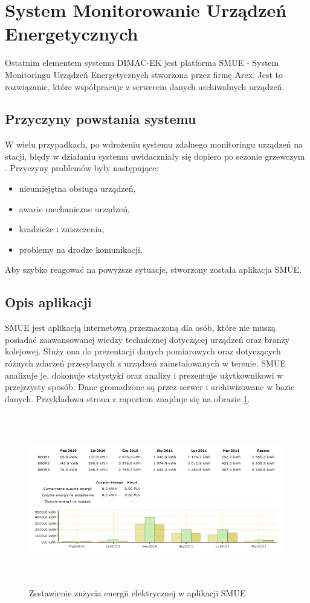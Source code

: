 \section{System Monitorowanie Urządzeń Energetycznych}
Ostatnim elementem systemu DIMAC-EK jest platforma SMUE - System Monitoringu Urządzeń Energetycznych stworzona przez firmę Arex. Jest to rozwiązanie, które współpracuje z serwerem danych archiwalnych urządzeń\cite{dimacek-wytyczne}. 

\subsection{Przyczyny powstania systemu}
W wielu przypadkach, po wdrożeniu systemu zdalnego monitoringu urządzeń na stacji, błędy w działaniu systemu uwidaczniały się dopiero po sezonie grzewczym \cite{dimacek-wytyczne}. Przyczyny problemów były następujące:
\begin{itemize}
\item nieumiejętna obsługa urządzeń,
\item awarie mechaniczne urządzeń,
\item kradzieże i zniszczenia,
\item problemy na drodze komunikacji.
\end{itemize}

Aby szybko reagować na powyższe sytuacje, stworzony została aplikacja SMUE.

\subsection{Opis aplikacji}
SMUE jest aplikacją internetową przeznaczoną dla osób, które nie muszą posiadać zaawansowanej wiedzy technicznej dotyczącej urządzeń oraz branży kolejowej\cite{dimacek-wytyczne}. Służy ona do prezentacji danych pomiarowych oraz dotyczących różnych zdarzeń przesyłanych z urządzeń zainstalowanych w terenie. SMUE analizuje je, dokonuje statystyki oraz analizy i prezentuje użytkownikowi w przejrzysty sposób. Dane gromadzone są  przez serwer i archiwizowane w bazie danych. Przykładowa strona z raportem znajduje się na obrazie \ref{fig:smue}.\\

\begin{figure}[h]
		\centerline{\includegraphics[height=75mm]{./img/smue.png}}
		\caption{Zestawienie zużycia energii elektrycznej w aplikacji SMUE}
		\label{fig:smue}
\end{figure}

